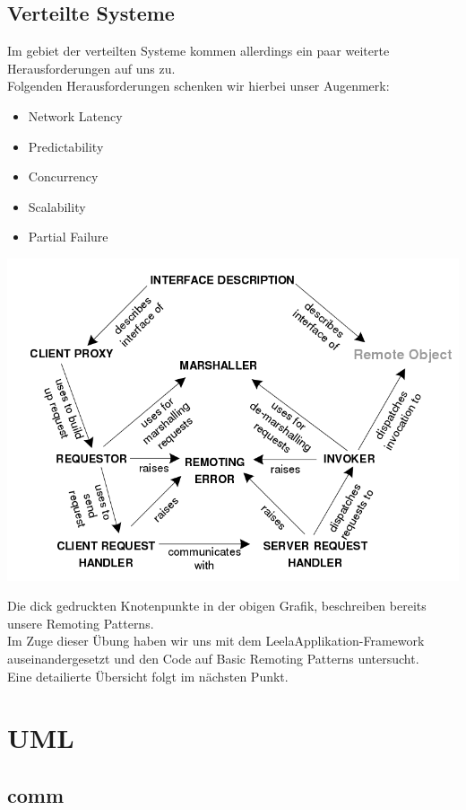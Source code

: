 \documentclass[a4paper]{article}
\begin{document}
\subsection{Verteilte Systeme}
Im gebiet der verteilten Systeme kommen allerdings ein paar weiterte Herausforderungen auf uns zu.\\
Folgenden Herausforderungen schenken wir hierbei unser Augenmerk:
\begin{itemize}
	\item Network Latency
	\item Predictability
	\item Concurrency
	\item Scalability
	\item Partial Failure
\end{itemize}
\begin{center}
	\includegraphics[scale=0.4]{img/remoting_patterns.png}
\end{center}
Die dick gedruckten Knotenpunkte in der obigen Grafik, beschreiben bereits unsere Remoting Patterns.\\
Im Zuge dieser Übung haben wir uns mit dem LeelaApplikation-Framework auseinandergesetzt und den Code auf Basic Remoting Patterns untersucht.\\
Eine detailierte Übersicht folgt im nächsten Punkt.
\cite{RP-WU-Wien}
\newpage
\section{UML}
	\subsection{comm}
\end{document}
